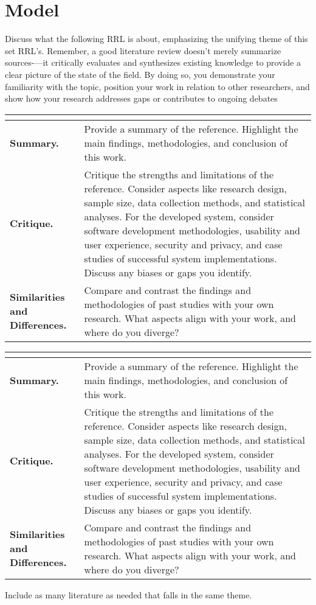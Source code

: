 \section{Model}

Discuss what the following RRL is about, emphasizing the unifying theme of this set RRL's. Remember, a good literature review doesn’t merely summarize sources-—it critically evaluates and synthesizes existing knowledge to provide a clear picture of the state of the field. By doing so, you demonstrate your familiarity with the topic, position your work in relation to other researchers, and show how your research addresses gaps or contributes to ongoing debates

\begin{longtable}{|L{.2\linewidth}|L{.74\linewidth}|}
	\hline
	\\ \hline
	\textbf{Summary.} & Provide a summary of the reference. Highlight the main findings, methodologies, and conclusion of this work.\\ \hline
	\textbf{Critique.} & Critique the strengths and limitations of the reference. Consider aspects like research design, sample size, data collection methods, and statistical analyses. For the developed system, consider software development methodologies, usability and user experience, security and privacy, and case studies of successful system implementations. Discuss any biases or gaps you identify.\\ \hline
	\textbf{Similarities and Differences.} & Compare and contrast the findings and methodologies of past studies with your own research. What aspects align with your work, and where do you diverge?\\ \hline
\end{longtable}

\begin{longtable}{|L{.2\linewidth}|L{.74\linewidth}|}
	\hline
	\\ \hline
	\textbf{Summary.} & Provide a summary of the reference. Highlight the main findings, methodologies, and conclusion of this work.\\ \hline
	\textbf{Critique.} & Critique the strengths and limitations of the reference. Consider aspects like research design, sample size, data collection methods, and statistical analyses. For the developed system, consider software development methodologies, usability and user experience, security and privacy, and case studies of successful system implementations. Discuss any biases or gaps you identify.\\ \hline
	\textbf{Similarities and Differences.} & Compare and contrast the findings and methodologies of past studies with your own research. What aspects align with your work, and where do you diverge?\\ \hline
\end{longtable}

Include as many literature as needed that falls in the same theme.



